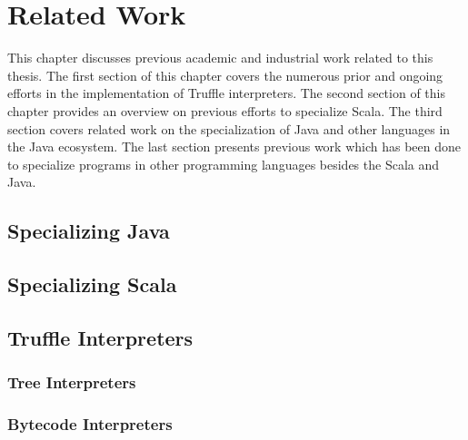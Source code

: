 
\chapter{Related Work}

This chapter discusses previous academic and industrial work related to this thesis. 
The first section of this chapter covers the numerous prior and ongoing efforts in the implementation of Truffle interpreters.
The second section of this chapter provides an overview on previous efforts to specialize Scala.
The third section covers related work on the specialization of Java and other languages in the Java ecosystem.
The last section presents previous work which has been done to specialize programs in other programming languages besides the Scala and Java.

\section{Specializing Java}

\section{Specializing Scala}

\section{Truffle Interpreters}

\subsection{Tree Interpreters}

\subsection{Bytecode Interpreters}
